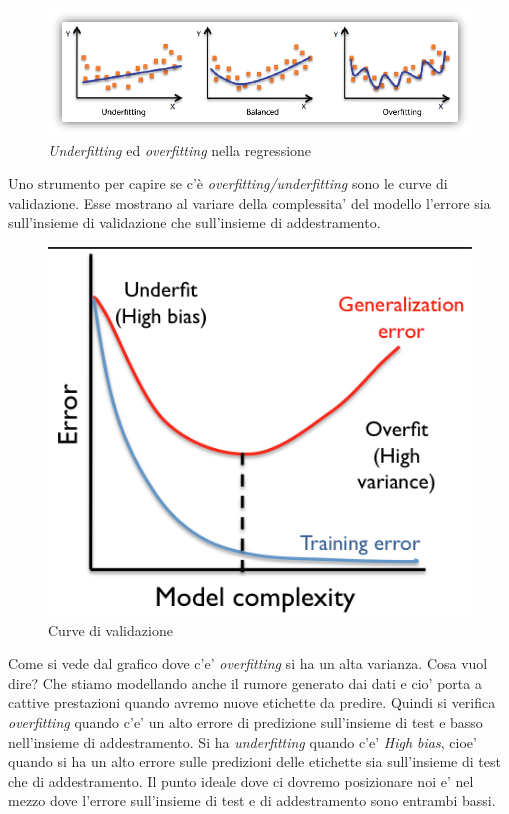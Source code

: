 \begin{figure}[H]
	\centering
	\includegraphics[width=1\linewidth]{img/underfittingoverfitting}
	\caption{\textit{Underfitting} ed \textit{overfitting} nella regressione}
	\label{fig:underfittingoverfitting}
\end{figure}

Uno strumento per capire se  c'\`e \textit{overfitting/underfitting} sono le curve di validazione. Esse mostrano al variare della complessita' del modello l'errore sia sull'insieme di validazione che sull'insieme di addestramento.

\begin{figure}[H]
	\centering
	\includegraphics[width=0.7\linewidth]{img/validation_curve}
	\caption{Curve di validazione}
	\label{fig:validationcurve}
\end{figure}

Come si vede dal grafico dove c'e' \textit{overfitting} si ha un alta varianza. Cosa vuol dire? Che stiamo modellando anche il rumore generato dai dati e cio' porta a cattive prestazioni quando avremo nuove etichette da predire. Quindi si verifica \textit{overfitting} quando c'e' un alto errore di predizione sull'insieme di test e basso nell'insieme di addestramento. Si ha \textit{underfitting} quando c'e' \textit{High bias}, cioe' quando si ha un alto errore sulle predizioni delle etichette sia sull'insieme di test che di addestramento. Il punto ideale dove ci dovremo posizionare noi e' nel mezzo dove l'errore sull'insieme di test e di addestramento sono entrambi bassi.
